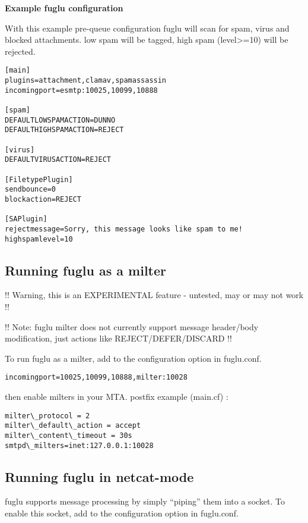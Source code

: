 \documentclass[letterpaper,10pt,english]{sphinxmanual}
\begin{document}
\textbf{Example fuglu configuration}

With this example pre-queue configuration fuglu will scan for spam, virus and blocked attachments. low spam will be tagged, high spam (level\textgreater{}=10) will be rejected.

\begin{Verbatim}[commandchars=\\\{\}]
[main]
plugins=attachment,clamav,spamassassin
incomingport=esmtp:10025,10099,10888

[spam]
DEFAULTLOWSPAMACTION=DUNNO
DEFAULTHIGHSPAMACTION=REJECT

[virus]
DEFAULTVIRUSACTION=REJECT

[FiletypePlugin]
sendbounce=0
blockaction=REJECT

[SAPlugin]
rejectmessage=Sorry, this message looks like spam to me!
highspamlevel=10
\end{Verbatim}


\subsection{Running fuglu as a milter}
\label{configuration-index:running-fuglu-as-a-milter}
!! Warning, this is an EXPERIMENTAL feature - untested, may or may not work !!

!! Note: fuglu milter does not currently support message header/body modification, just actions like REJECT/DEFER/DISCARD !!

To run fuglu as a milter, add  to the  configuration option in fuglu.conf.

\begin{Verbatim}[commandchars=\\\{\}]
incomingport=10025,10099,10888,milter:10028
\end{Verbatim}

then enable milters in your MTA. postfix example (main.cf) :

\begin{Verbatim}[commandchars=\\\{\}]
milter\_protocol = 2
milter\_default\_action = accept
milter\_content\_timeout = 30s
smtpd\_milters=inet:127.0.0.1:10028
\end{Verbatim}


\subsection{Running fuglu in netcat-mode}
\label{configuration-index:running-fuglu-in-netcat-mode}
fuglu supports message processing by simply ``piping'' them into a socket. To enable this socket, add  to the  configuration option in fuglu.conf.
\end{document}
